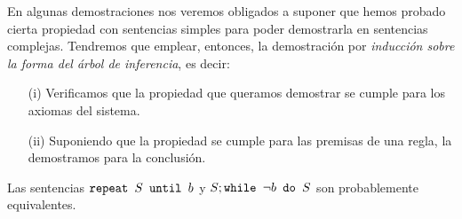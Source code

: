 En algunas demostraciones nos veremos obligados a suponer que hemos probado cierta propiedad con sentencias simples para poder demostrarla en sentencias complejas. Tendremos que emplear, entonces, la demostración por \textit{inducción sobre la forma del árbol de inferencia}, es decir:
\begin{itemize}
    \item[(i)] Verificamos que la propiedad que queramos demostrar se cumple para los axiomas del sistema.
    \item[(ii)] Suponiendo que la propiedad se cumple para las premisas de una regla, la demostramos para la conclusión.
\end{itemize}

\begin{prop}
Las sentencias $\texttt{repeat }S\texttt{ until }b$ y $S;\texttt{while }\neg b\texttt{ do }S$ son probablemente equivalentes.
\end{prop}
